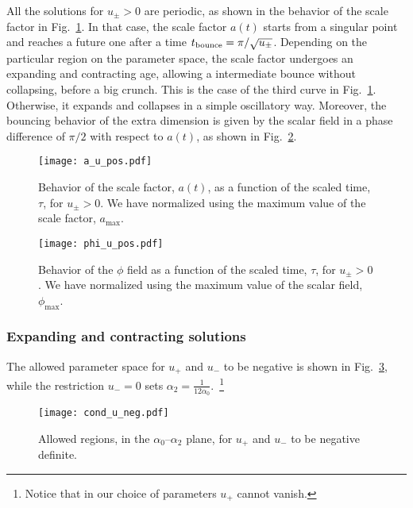 \documentclass[aps,prd,12pt,superscriptaddress,showpacs,showkeys,longbibliography,reprint,nofootinbib]{revtex4-1}
\begin{document}
All the solutions for $u_\pm>0$ are periodic, as shown in the behavior of the scale factor in Fig.~\ref{a_u_pos}. In that case, the scale factor $a(t)$ starts from a singular point and reaches a future one after a time $t_{\rm bounce}=\pi/\sqrt{u_\pm}$. Depending on the particular region on the parameter space, the scale factor undergoes an expanding and contracting age, allowing a intermediate bounce without collapsing, before a big crunch. This is the case of the third curve in Fig.~\ref{a_u_pos}. Otherwise, it expands and collapses in a {simple} oscillatory way.
Moreover, the bouncing behavior of the extra dimension is given by the scalar field in a phase difference of $\pi/2$ with respect to $a(t)$, as shown in Fig.~\ref{phi_u_pos}. %
\begin{figure}[H]
  \texttt{[image: a\_u\_pos.pdf]}
  \caption{Behavior of the scale factor, \(a(t)\), as a function of the scaled time, $\tau$, for $u_\pm > 0$. We have normalized using the maximum value of the scale factor, $a_{\mathrm{max}}$.}
  \label{a_u_pos}
\end{figure}
\begin{figure}[H]
  \texttt{[image: phi\_u\_pos.pdf]}
  \caption{Behavior of the $\phi$ field as a function of the scaled time, $\tau$, for $u_\pm > 0$. We have normalized using the maximum value of the scalar field, $\phi_{\mathrm{max}}$.}
  \label{phi_u_pos}
\end{figure}

\subsubsection{Expanding and contracting solutions}

The allowed parameter space for $u_+$ and $u_-$ to be negative is shown in Fig.~\ref{cond_u_neg}, while the restriction $u_- = 0$ sets $\alpha_2 = \tfrac{1}{12 \alpha_0}$.~\footnote{Notice that in our choice of parameters $u_+$ cannot vanish.}

\begin{figure}[H]
  \texttt{[image: cond\_u\_neg.pdf]}
  \caption{Allowed regions, in the $\alpha_0$--$\alpha_2$ plane, for $u_+$ and $u_-$ to be negative definite.}
  \label{cond_u_neg}  
\end{figure}
\end{document}
